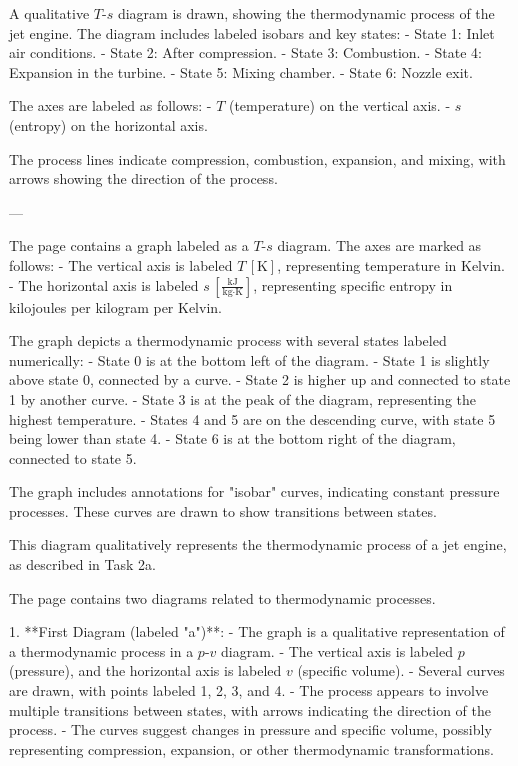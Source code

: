 A qualitative \( T \)-\( s \) diagram is drawn, showing the thermodynamic process of the jet engine. The diagram includes labeled isobars and key states:  
- State 1: Inlet air conditions.  
- State 2: After compression.  
- State 3: Combustion.  
- State 4: Expansion in the turbine.  
- State 5: Mixing chamber.  
- State 6: Nozzle exit.  

The axes are labeled as follows:  
- \( T \) (temperature) on the vertical axis.  
- \( s \) (entropy) on the horizontal axis.  

The process lines indicate compression, combustion, expansion, and mixing, with arrows showing the direction of the process.  

---

The page contains a graph labeled as a \( T \)-\( s \) diagram. The axes are marked as follows:  
- The vertical axis is labeled \( T \, [\text{K}] \), representing temperature in Kelvin.  
- The horizontal axis is labeled \( s \, [\frac{\text{kJ}}{\text{kg·K}}] \), representing specific entropy in kilojoules per kilogram per Kelvin.  

The graph depicts a thermodynamic process with several states labeled numerically:  
- State 0 is at the bottom left of the diagram.  
- State 1 is slightly above state 0, connected by a curve.  
- State 2 is higher up and connected to state 1 by another curve.  
- State 3 is at the peak of the diagram, representing the highest temperature.  
- States 4 and 5 are on the descending curve, with state 5 being lower than state 4.  
- State 6 is at the bottom right of the diagram, connected to state 5.  

The graph includes annotations for "isobar" curves, indicating constant pressure processes. These curves are drawn to show transitions between states.  

This diagram qualitatively represents the thermodynamic process of a jet engine, as described in Task 2a.

The page contains two diagrams related to thermodynamic processes.  

1. **First Diagram (labeled "a")**:  
   - The graph is a qualitative representation of a thermodynamic process in a \( p \)-\( v \) diagram.  
   - The vertical axis is labeled \( p \) (pressure), and the horizontal axis is labeled \( v \) (specific volume).  
   - Several curves are drawn, with points labeled 1, 2, 3, and 4.  
   - The process appears to involve multiple transitions between states, with arrows indicating the direction of the process.  
   - The curves suggest changes in pressure and specific volume, possibly representing compression, expansion, or other thermodynamic transformations.  

